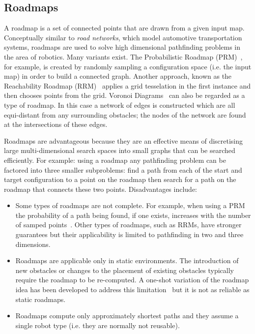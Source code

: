 \subsection{Roadmaps}
\label{cha::lit::graphs::road}
A roadmap is a set of connected points that are drawn from a given input map.
Conceptually similar to \emph{road networks}, which model automotive
transportation systems, roadmaps are used to solve high dimensional pathfinding
problems in the area of robotics.  Many variants exist. The Probabilistic
Roadmap (PRM)~\citep{kavraki94}, for example,
 is created by randomly sampling a configuration space (i.e. the input map) in
order to build a connected graph. Another approach, known as the Reachability
Roadmap (RRM)~\citep{geraerts05} applies a grid tesselation in the first
instance and then chooses points from the grid.  Voronoi Diagrams~\citep{aurenhammer91}
can also be regarded as a type of roadmap. In this case a network of edges is constructed
which are all equi-distant from any surrounding obstacles; the nodes of the network are 
found at the intersections of these edges.

Roadmaps are advantageous because they are an effective means of discretising
large multi-dimensional search spaces into small graphs that can be searched
efficiently. For example: using a roadmap any pathfinding problem can be
factored into three smaller subproblems: find a path from each of the start and
target configuration to a point on the roadmap then search for a path on the
roadmap that connects these two points. Disadvantages include:
\begin{itemize}
\item{Some types of roadmaps are not complete. For example, when using a PRM the probability of 
a path being found, if one exists, increases with the number  of samped points~\citep{barraquand97}. 
Other types of roadmaps, such as RRMs, have stronger guarantees but their applicability
is limited to pathfinding in two and three dimensions.}
\item{Roadmaps are applicable only in static environments. The introduction of
new obstacles or changes to the placement of existing obstacles typically require 
the roadmap to be re-computed. A one-shot variation of the roadmap idea has been
developed to address this limitation~\citep{lavalle98} but it is not as reliable
as static roadmaps.}
\item{Roadmaps compute only approximately shortest paths and they assume a single 
robot type (i.e. they are normally not reusable).}
\end{itemize}


